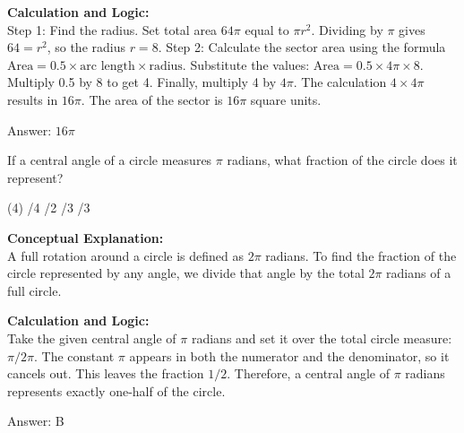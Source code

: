 \documentclass[11pt,paper=a4,answers]{exam}
\begin{document}
\begin{questions}
\begin{solution}
\vspace{30pt}

\textbf{Calculation and Logic:} \\
Step 1: Find the radius. Set total area $64\pi$ equal to $\pi r^2$. Dividing by $\pi$ gives $64 = r^2$, so the radius $r = 8$. Step 2: Calculate the sector area using the formula $\text{Area} = 0.5 \times \text{arc length} \times \text{radius}$. Substitute the values: $\text{Area} = 0.5 \times 4\pi \times 8$. Multiply 0.5 by 8 to get 4. Finally, multiply 4 by $4\pi$. The calculation $4 \times 4\pi$ results in $16\pi$. The area of the sector is $16\pi$ square units.

\vspace{30pt}

Answer: \colorbox{yellow!100}{$16\pi$}
\end{solution}

\vspace{60pt}

\question
If a central angle of a circle measures $\pi$ radians, what fraction of the circle does it represent?
\begin{tasks}(4)
    /4
    /2
    /3
    /3
\end{tasks}

\begin{solution}
\textbf{Conceptual Explanation:} \\
A full rotation around a circle is defined as $2\pi$ radians. To find the fraction of the circle represented by any angle, we divide that angle by the total $2\pi$ radians of a full circle.

\vspace{30pt}

\textbf{Calculation and Logic:} \\
Take the given central angle of $\pi$ radians and set it over the total circle measure: $\pi / 2\pi$. The constant $\pi$ appears in both the numerator and the denominator, so it cancels out. This leaves the fraction $1 / 2$. Therefore, a central angle of $\pi$ radians represents exactly one-half of the circle.

\vspace{30pt}

Answer: \colorbox{yellow!100}{B}
\end{solution}

\vspace{60pt}


\end{questions}
\end{document}
